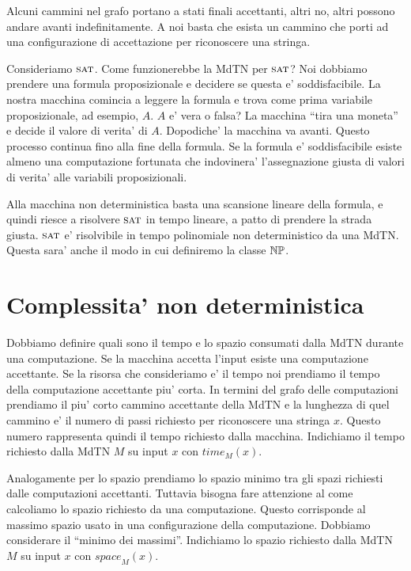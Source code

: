 Alcuni cammini nel grafo portano a stati finali accettanti, altri no, altri possono andare avanti
indefinitamente. A noi basta che esista un cammino che porti ad una configurazione di accettazione
per riconoscere una stringa.


Consideriamo $\textsc{sat}$. Come funzionerebbe la MdTN per $\textsc{sat}$? Noi dobbiamo prendere una formula
proposizionale e decidere se questa e' soddisfacibile. La nostra macchina comincia a leggere la
formula e trova come prima variabile proposizionale, ad esempio, $A$. $A$ e' vera o falsa? La
macchina ``tira una moneta'' e decide il valore di verita' di $A$. Dopodiche' la macchina va avanti.
Questo processo continua fino alla fine della formula. Se la formula e' soddisfacibile esiste almeno
una computazione fortunata che indovinera' l'assegnazione giusta di valori di verita' alle variabili
proposizionali.

Alla macchina non deterministica basta una scansione lineare della formula, e quindi riesce a
risolvere $\textsc{sat}$ in tempo lineare, a patto di prendere la strada giusta. $\textsc{sat}$ e' risolvibile in
tempo polinomiale non deterministico da una MdTN. Questa sara' anche il modo in cui definiremo la
classe $\mathbb{NP}$.

\section{Complessita' non deterministica}

Dobbiamo definire quali sono il tempo e lo spazio consumati dalla MdTN durante una computazione. Se
la macchina accetta l'input esiste una computazione accettante. Se la risorsa che consideriamo e' il
tempo noi prendiamo il tempo della computazione accettante piu' corta. In termini del grafo delle
computazioni prendiamo il piu' corto cammino accettante della MdTN e la lunghezza di quel cammino e'
il numero di passi richiesto per riconoscere una stringa $x$. Questo numero rappresenta quindi il
tempo richiesto dalla macchina. Indichiamo il tempo richiesto dalla MdTN $M$ su input $x$ con
$\textit{time}_{M}(x)$.

Analogamente per lo spazio prendiamo lo spazio minimo tra gli spazi richiesti dalle computazioni
accettanti. Tuttavia bisogna fare attenzione al come calcoliamo lo spazio richiesto da una
computazione. Questo corrisponde al massimo spazio usato in una configurazione della computazione.
Dobbiamo considerare il ``minimo dei massimi''. Indichiamo lo spazio richiesto dalla MdTN $M$ su
input $x$ con $\textit{space}_{M}(x)$.

